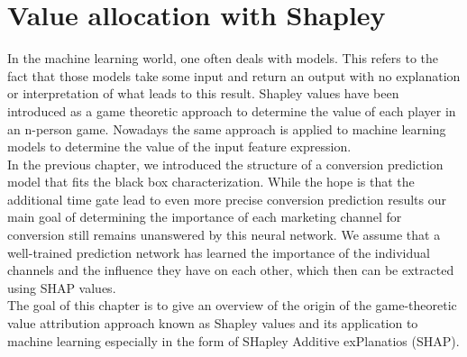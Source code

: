 \chapter{Value allocation with Shapley}

In the machine learning world, one often deals with  models. This refers to the fact that those models take some input and return an output with no explanation or interpretation of what leads to this result. 
Shapley values have been introduced as a game theoretic approach to determine the value of each player in an n-person game. Nowadays the same approach is applied to machine learning  models to determine the value of the input feature expression.\\

In the previous chapter, we introduced the structure of a conversion prediction model that fits the black box characterization. While the hope is that the additional time gate lead to even more precise conversion prediction results our main goal of determining the importance of each marketing channel for conversion still remains unanswered by this neural network. 
We assume that a well-trained prediction network has learned the importance of the individual channels and the influence they have on each other, which then can be extracted using SHAP values. \\
The goal of this chapter is to give an overview of the origin of the game-theoretic value attribution approach known as Shapley values and its application to machine learning especially in the form of SHapley Additive exPlanatios (SHAP).

